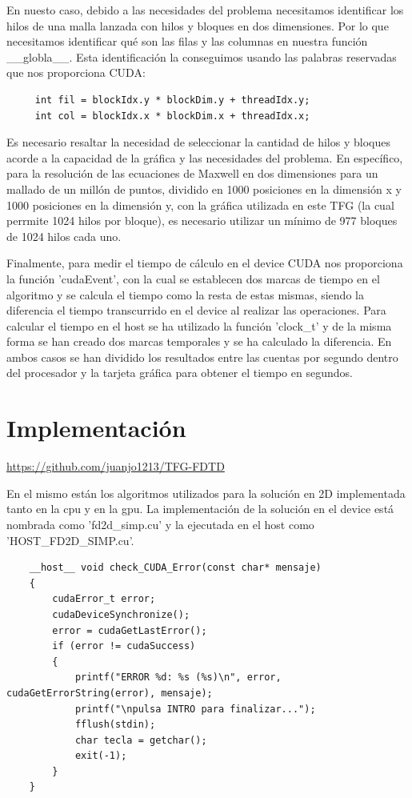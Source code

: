 \documentclass[11pt,a4paper,twoside,pdf]{article}
\numberwithin{equation}{section}
\begin{document}
En nuesto caso, debido a las necesidades del problema necesitamos identificar los hilos de una malla lanzada con hilos y bloques en dos dimensiones. Por lo que necesitamos identificar qué son las filas y las columnas en nuestra función \_\_globla\_\_. Esta identificación la conseguimos usando las palabras reservadas que nos proporciona CUDA:

\begin{verbatim}
     int fil = blockIdx.y * blockDim.y + threadIdx.y;
     int col = blockIdx.x * blockDim.x + threadIdx.x;
\end{verbatim}

Es necesario resaltar la necesidad de seleccionar la cantidad de hilos y bloques acorde a la capacidad de la gráfica y las necesidades del problema. En específico, para la resolución de las ecuaciones de Maxwell en dos dimensiones para un mallado de un millón de puntos, dividido en 1000 posiciones en la dimensión x y 1000 posiciones en la dimensión y, con la gráfica utilizada en este TFG (la cual perrmite 1024 hilos por bloque), es necesario utilizar un mínimo de 977 bloques de 1024 hilos cada uno.


Finalmente, para medir el tiempo de cálculo en el device CUDA nos proporciona la función 'cudaEvent', con la cual se establecen dos marcas de tiempo en el algoritmo y se calcula el tiempo como la resta de estas mismas, siendo la diferencia el tiempo transcurrido en el device al realizar las operaciones.
Para calcular el tiempo en el host se ha utilizado la función 'clock\_t' y de la misma forma se han creado dos marcas temporales y se ha calculado la diferencia. En ambos casos se han dividido los resultados entre las cuentas por segundo dentro del procesador y la tarjeta gráfica para obtener el tiempo en segundos.

\section{Implementación}

\url{https://github.com/juanjo1213/TFG-FDTD}

En el mismo están los algoritmos utilizados para la solución en 2D implementada tanto en la cpu y en la gpu. La implementación de la solución en el device está nombrada como 'fd2d\_simp.cu' y la ejecutada en el host como 'HOST\_FD2D\_SIMP.cu'.

\begin{verbatim}
	__host__ void check_CUDA_Error(const char* mensaje)
	{
		cudaError_t error;
		cudaDeviceSynchronize();
		error = cudaGetLastError();
		if (error != cudaSuccess)
		{
			printf("ERROR %d: %s (%s)\n", error, cudaGetErrorString(error), mensaje);
            printf("\npulsa INTRO para finalizar...");
            fflush(stdin);
        	char tecla = getchar();
			exit(-1);
		}
	}
\end{verbatim}
\end{document}
